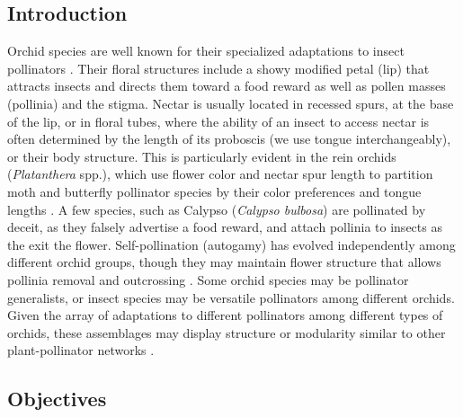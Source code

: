 \vspace{4mm}

\begin{multicols}{2}





\section{Introduction} 

Orchid species are well known for their specialized adaptations to
insect pollinators \citep[e.g.,][]{Darwin1862, Argue2012a, Argue2012b}. Their floral
structures include a showy modified petal (lip) that attracts insects
and directs them toward a food reward as well as pollen masses
(pollinia) and the stigma. Nectar is usually located in recessed spurs,
at the base of the lip, or in floral tubes, where the ability of an
insect to access nectar is often determined by the length of its
proboscis (we use tongue interchangeably), or their body structure. This
is particularly evident in the rein orchids (\emph{Platanthera} spp.),
which use flower color and nectar spur length to partition moth and
butterfly pollinator species by their color preferences and tongue
lengths \citep{HapemanInoue1997}. A few species, such as Calypso
(\emph{Calypso bulbosa}) are pollinated by deceit, as they falsely
advertise a food reward, and attach pollinia to insects as the exit the
flower. Self-pollination (autogamy) has evolved independently among
different orchid groups, though they may maintain flower structure that
allows pollinia removal and outcrossing \citep{Catling1983}. Some orchid
species may be pollinator generalists, or insect species may be
versatile pollinators among different orchids. Given the array of
adaptations to different pollinators among different types of orchids,
these assemblages may display structure or modularity similar to other
plant-pollinator networks \citep[e.g.,][]{Olesenetal2007}.

\subsection{Objectives}


\end{multicols}

